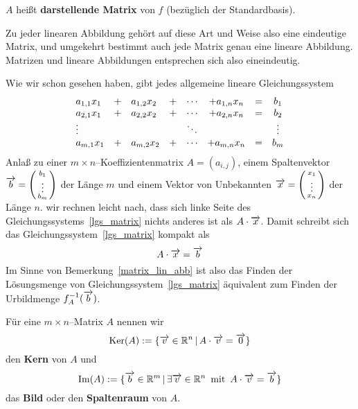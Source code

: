 \begin{notiz}
$A$ heißt \textbf{darstellende Matrix} von $f$ 
(bezüglich der Standardbasis).

Zu jeder linearen Abbildung gehört auf diese Art und Weise also eine eindeutige Matrix, 
und umgekehrt bestimmt auch jede Matrix genau eine lineare Abbildung. Matrizen und lineare 
Abbildungen entsprechen sich also eineindeutig.
\end{notiz}

\bigbreak
         
Wie wir schon gesehen haben, gibt jedes allgemeine lineare Gleichungssystem 
  	\begin{equation}\label{lgs_matrix}
 	\begin{array} {l c l c c c l c l }
  	a_{1,1} x_1 & + & a_{1,2} x_2 & + & \cdots & + a_{1,n} x_n & = & b_1 \\
  	a_{2,1} x_1 & + & a_{2,2} x_2 & + & \cdots & + a_{2,n} x_n & = & b_2 \\
  	\vdots & & & & \ddots & & & \vdots \\
  	a_{m,1} x_1 & + & a_{m,2} x_2 & + & \cdots & + a_{m,n} x_n & = & b_m 
  	\end{array} 
  	\end{equation}
Anlaß zu einer $m \times n$--Koeffizientenmatrix $A = \left(a_{i,j}\right)$, einem Spaltenvektor 
$\overrightarrow{b} = \left( \begin{smallmatrix} b_1 \\ \vdots \\ b_m \end{smallmatrix} \right)$ der 
Länge $m$ und einem Vektor von Unbekannten $\overrightarrow{x} 
= \left( \begin{smallmatrix} x_1 \\ \vdots \\ x_n \end{smallmatrix} \right)$ der Länge $n$. wir rechnen 
leicht nach, dass sich linke Seite des Gleichungssystems~\ref{lgs_matrix} nichts anderes ist als
$A \cdot \overrightarrow{x}$. Damit schreibt sich das Gleichungssystem~\ref{lgs_matrix} kompakt als
  	$$ A \cdot \overrightarrow{x} = \overrightarrow{b} $$
Im Sinne von Bemerkung~\ref{matrix_lin_abb} ist also das Finden der Lösungsmenge von 
Gleichungssystem~\ref{lgs_matrix} äquivalent zum Finden der Urbildmenge $f_A^{-1}(\overrightarrow{b})$.

\medbreak

\begin{definition} Für eine $m \times n$--Matrix $A$ nennen wir
  	$$ \mathrm{Ker}(A) := \{ \overrightarrow{v} \in \mathbb R^n \, \vert \, A \cdot \overrightarrow{v} = \overrightarrow{0} \} $$
den \textbf{Kern} von $A$ und 
  	$$ \mathrm{Im}(A) := \{ \overrightarrow{b} \in \mathbb R^m \, \vert \, \exists \overrightarrow{v} \in \mathbb R^n \,
	\textrm{ mit }\,  A \cdot \overrightarrow{v} = \overrightarrow{b} \} $$
das \textbf{Bild} oder den \textbf{Spaltenraum} von $A$.
\end{definition}

